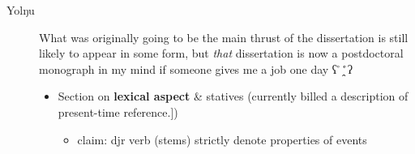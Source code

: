 \documentclass[11pt,dvipsnames]{article}
\begin{document}
\begin{description}
\begin{itemize}
\end{itemize}
\item[Yolŋu] What was originally going to be the main thrust of the dissertation is still likely to appear in some form, but \textit{that} dissertation is now a postdoctoral monograph in my mind if someone gives me a job one day  ʕ  ̊ ̯͑ ̊ʔ
\begin{itemize}
	\item Section on \textbf{lexical aspect} \& statives (currently billed a description of present-time reference.])
	\begin{itemize}
		\item claim: djr verb (stems) strictly denote properties of events
	\end{itemize}
\end{itemize}
	\begin{description}
		

\end{description}
\end{description}
\end{document}
